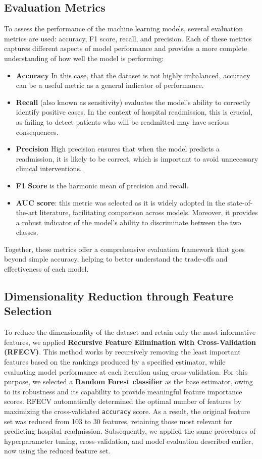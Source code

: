 \subsection{Evaluation Metrics}
To assess the performance of the machine learning models, several evaluation metrics are used: accuracy, F1 score, recall, and precision. Each of these metrics captures different aspects of model performance and provides a more complete understanding of how well the model is performing:
\begin{itemize}
    \item \textbf{Accuracy} In this case, that the dataset is not highly imbalanced, accuracy can be a useful metric as a general indicator of performance. 
    \item \textbf{Recall} (also known as sensitivity) evaluates the model’s ability to correctly identify positive cases. In the context of hospital readmission, this is crucial, as failing to detect patients who will be readmitted may have serious consequences.
    \item \textbf{Precision} High precision ensures that when the model predicts a readmission, it is likely to be correct, which is important to avoid unnecessary clinical interventions.
    \item \textbf{F1 Score} is the harmonic mean of precision and recall.
    \item \textbf{AUC score}: this metric was selected as it is widely adopted in the state-of-the-art literature, facilitating comparison across models. Moreover, it provides a robust indicator of the model’s ability to discriminate between the two classes.
\end{itemize}
\noindent
Together, these metrics offer a comprehensive evaluation framework that goes beyond simple accuracy, helping to better understand the trade-offs and effectiveness of each model.

\subsection{Dimensionality Reduction through Feature Selection}

To reduce the dimensionality of the dataset and retain only the most informative features, we applied \textbf{Recursive Feature Elimination with Cross-Validation (RFECV)}. This method works by recursively removing the least important features based on the rankings produced by a specified estimator, while evaluating model performance at each iteration using cross-validation.
For this purpose, we selected a \textbf{Random Forest classifier} as the base estimator, owing to its robustness and its capability to provide meaningful feature importance scores. RFECV automatically determined the optimal number of features by maximizing the cross-validated \texttt{accuracy} score.
As a result, the original feature set was reduced from 103 to 30 features, retaining those most relevant for predicting hospital readmission. Subsequently, we applied the same procedures of hyperparameter tuning, cross-validation, and model evaluation described earlier, now using the reduced feature set.

